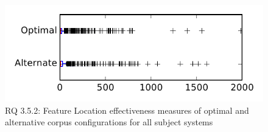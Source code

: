 
\begin{figure}
\centering
\includegraphics[height=0.4\textheight]{figures/combo/flt_rq2_tiny}
\caption{RQ 3.5.2: Feature Location effectiveness measures of optimal and alternative corpus configurations for all subject systems}
\label{fig:combo:flt:rq2:tiny}
\end{figure}
